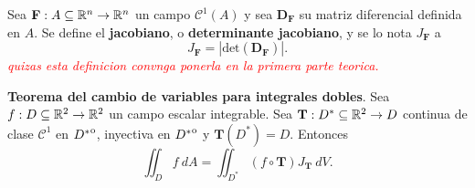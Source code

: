 \begin{definition}
    Sea $\mathbf{F}:A\subseteq\mathbb{R}^n\to\mathbb{R}^n$ un campo $\mathcal{C}^1(A)$ y sea $\boldsymbol{D}_\mathbf{F}$ su matriz diferencial definida en $A$. Se define el \textbf{jacobiano}, o \textbf{determinante jacobiano}, y se lo nota $J_\mathbf{F}$ a 
    \[
        J_\mathbf{F}=\left|\text{det}(\boldsymbol{D}_\mathbf{F})\right|.
    \]
    \textcolor{red}{\textit{quizas esta definicion convnga ponerla en la primera parte teorica.}}
\end{definition}

\begin{theorem} %
    \textbf{Teorema del cambio de variables para integrales dobles}. Sea $f:D\subseteq\mathbb{R}^2\to\mathbb{R}^2$ un campo escalar integrable. Sea $\mathbf{T}:D^*\subseteq\mathbb{R}^2\to D$ continua de clase $\mathcal{C}^1$ en ${\kern0ptD^*}^{\mathrm{o}}$, inyectiva en ${\kern0ptD^*}^{\mathrm{o}}$ y $\mathbf{T}(D^*)=D$. Entonces
    \[
        \iint_D f\:dA=\iint_{D^*}(f\circ\mathbf{T})J_\mathbf{T}\:dV.
    \]
\end{theorem}